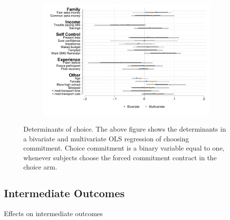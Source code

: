 \begin{appendix}
\begin{figure}[H]
    \begin{center}
    \begin{subfigure}{0.6\textwidth}
        \centering
        \includegraphics[width=\textwidth]{Figuras/determinants_choose_commitment.pdf}
    \end{subfigure}
    \end{center}
\caption{Determinants of choice. The above figure shows the determinants in a bivariate and multivariate OLS regression of choosing commitment. Choice commitment is a binary variable equal to one, whenever subjects choose the forced commitment contract in the choice arm. }
    \label{determinants_choose}
\end{figure}


\subsection{Intermediate Outcomes}

\begin{landscape}
    
\begin{table}[!h]
\caption{Effects on intermediate outcomes}
\label{mechanisms}
\begin{center}

\scriptsize{}


\end{center}
\end{table}
\end{landscape}
\end{appendix}
